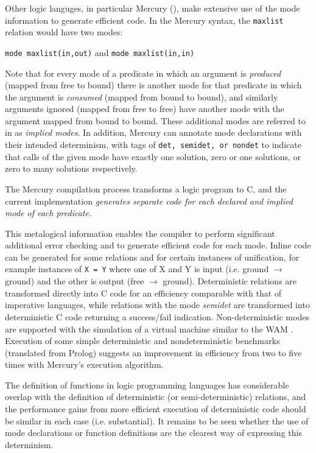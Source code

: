 Other logic languges, in particular Mercury (\cite{SHC95}), make extensive use of the mode
information to generate efficient code.
In the Mercury syntax, the \texttt{maxlist} relation would have two modes:\\
\begin{center}\texttt{mode maxlist(in,out)} and \texttt{mode maxlist(in,in)}\end{center}
Note that for every mode of a predicate in which an argument is \textit{produced} (mapped
from free to bound) there is another mode for that predicate in which the argument is
\textit{consumed} (mapped from bound to bound), and similarly arguments ignored (mapped from
free to free) have another mode with the argument mapped from bound to bound.  These additional
modes are referred to in \cite{SHC95} as \textit{implied modes}.
In addition, Mercury can annotate mode declarations with their intended determinism, with tags of
\texttt{det, semidet, or nondet} to indicate that calls of the given mode have exactly one
solution, zero or one solutions, or zero to many solutions respectively.

The Mercury compilation process transforms a logic
program to C, and the current implementation \textit{generates separate code for each
declared and implied mode of each
predicate.}

This metalogical information enables the compiler to perform significant additional error
checking and to generate efficient code for each mode.  Inline code can be generated for some
relations and for certain instances of unification, for example instances of 
\texttt{X = Y} where one of X and Y is input (i.e. ground $\rightarrow$ ground) and the other is
output (free $\rightarrow$ ground).  Deterministic relations are transformed directly into C code for
an efficiency comparable with that of imperative languages, while relations with
the mode \textit{semidet}
are transformed into deterministic C code returning a success/fail indication.
Non-deterministic modes are supported with the simulation of a virtual machine similar to
the WAM \cite{AK90}.  Execution of some simple deterministic and nondeterministic benchmarks
(translated from Prolog) suggests an improvement in efficiency from two to five times with
Mercury's execution algorithm.

The definition of functions in logic programming languages has considerable overlap with the
definition of deterministic (or semi-deterministic) relations, and the performance gains from
more efficient execution of deterministic code should be similar in each case (i.e.
substantial).  It remains to be seen whether the use of mode declarations or
function definitions are the clearest way of expressing this determinism.

